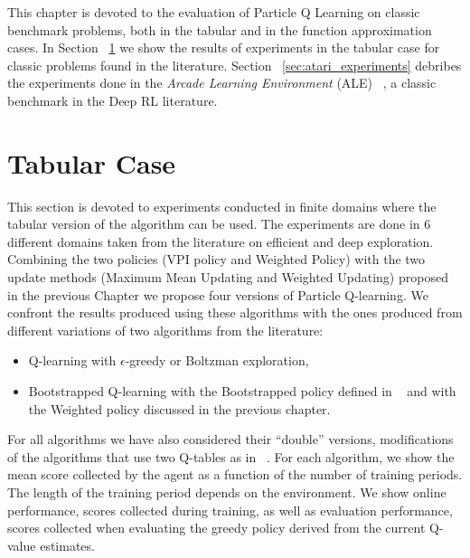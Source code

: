 This chapter is devoted to the evaluation of Particle Q Learning on classic benchmark problems, both in the tabular and in the function approximation cases. In Section ~\ref{sec:tabular_experiments} we show the results of experiments in the tabular case for classic problems found in the literature. Section ~\ref{sec:atari_experiments} debribes the experiments done in the \emph{Arcade Learning Environment} (ALE) ~\cite{Bellemare:2013:ALE:2566972.2566979}, a classic benchmark in the Deep RL literature. 
\section{Tabular Case} \label{sec:tabular_experiments}
This section is devoted to experiments conducted in finite domains where the tabular version of the algorithm can be used. The experiments are done in 6 different domains taken from the literature on efficient and deep exploration. Combining  the two policies (VPI policy and Weighted Policy) with the two update methods (Maximum Mean Updating and Weighted Updating) proposed in the previous Chapter we propose four versions of Particle Q-learning. We confront the results produced using these algorithms with the ones produced from different variations of two algorithms from the literature:
\begin{itemize}
\item Q-learning with $\epsilon$-greedy or Boltzman exploration,
\item Bootstrapped Q-learning with the Bootstrapped policy defined in ~\cite{DBLP:journals/corr/OsbandBPR16} and with the Weighted policy discussed in the previous chapter.
\end{itemize}
For all algorithms we have also considered their ``double'' versions, \ie modifications of the algorithms that use two Q-tables as in ~\cite{Hasselt:2016:DRL:3016100.3016191}. For each algorithm, we show the mean score collected by the agent as a function of the number of training periods. The length of the training period depends on the environment. We show online performance, \ie scores collected during training, as well as evaluation performance, \ie scores collected when evaluating the greedy policy derived from the current Q-value estimates.

